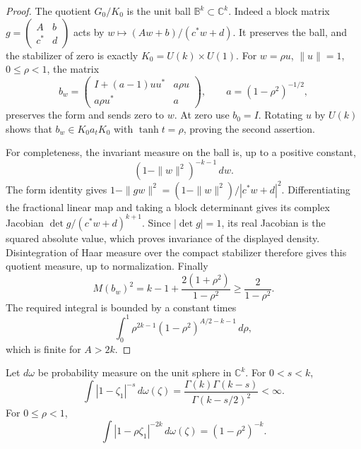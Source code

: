\begin{proof}
The quotient \(G_0/K_0\) is the unit ball
\(\mathbb B^k\subset\mathbb C^k\).
Indeed a block matrix
\(g=\left(\begin{smallmatrix}A&b\\c^*&d\end{smallmatrix}\right)\)
acts by \(w\mapsto(Aw+b)/(c^*w+d)\).
It preserves the ball, and the stabilizer of zero is exactly
\(K_0=U(k)\times U(1)\).
For \(w=\rho u\), \(\|u\|=1\), \(0\leq\rho<1\), the matrix
\[
 b_w=
 \begin{pmatrix}
 I+(a-1)uu^*&a\rho u\\
 a\rho u^*&a
 \end{pmatrix},
 \qquad a=(1-\rho^2)^{-1/2},
\]
preserves the form and sends zero to \(w\).
At zero use \(b_0=I\).
Rotating \(u\) by \(U(k)\) shows that \(b_w\in K_0a_tK_0\)
with \(\tanh t=\rho\), proving the second assertion.

For completeness, the invariant measure on the ball is,
up to a positive constant,
\[
                       (1-\|w\|^2)^{-k-1}\,dw.
\]
The form identity gives
\(1-\|gw\|^2=(1-\|w\|^2)/|c^*w+d|^2\).
Differentiating the fractional linear map and taking a
block determinant gives its complex Jacobian
\(\det g/(c^*w+d)^{k+1}\).
Since \(|\det g|=1\), its real Jacobian is the squared
absolute value, which proves invariance of the displayed
density.
Disintegration of Haar measure over the compact stabilizer
therefore gives this quotient measure, up to normalization.
Finally
\[
 M(b_w)^2=k-1+\frac{2(1+\rho^2)}{1-\rho^2}
                         \geq\frac2{1-\rho^2}.
\]
The required integral is bounded by a constant times
\[
 \int_0^1 \rho^{2k-1}
               (1-\rho^2)^{A/2-k-1}\,d\rho,
\]
which is finite for \(A>2k\).
\end{proof}

\begin{lemma}\label{jm-sphere}
Let \(d\omega\) be probability measure on the unit sphere in
\(\mathbb C^k\).  For \(0<s<k\),
\begin{equation}\label{jm-angular}
 \int |1-\zeta_1|^{-s}\,d\omega(\zeta)
       =\frac{\Gamma(k)\Gamma(k-s)}
                    {\Gamma(k-s/2)^2}<\infty.
\end{equation}
For \(0\leq\rho<1\),
\begin{equation}\label{jm-poisson}
 \int |1-\rho\zeta_1|^{-2k}\,d\omega(\zeta)
                                      =(1-\rho^2)^{-k}.
\end{equation}
\end{lemma}

